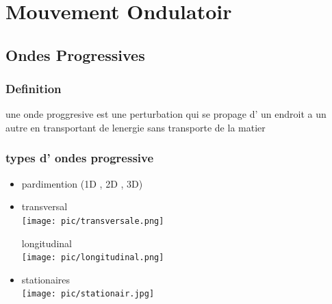 \documentclass[12pt]{book}
\begin{document}
    \chapter{Mouvement Ondulatoir}
        \section{Ondes Progressives}
            \subsection*{Definition}
                une onde proggresive est une perturbation qui se propage d' un endroit a un autre en transportant de lenergie sans transporte de la matier
            \subsection*{types d' ondes progressive}
                \begin{itemize}
                    \item pardimention (1D , 2D , 3D)
                    \item 
                        \begin{minipage}{0.49\linewidth}
                            transversal \\
                            \texttt{[image: pic/transversale.png]}
                        \end{minipage}
                        \begin{minipage}{0.49\linewidth}
                            longitudinal \\
                            \texttt{[image: pic/longitudinal.png]}
                        \end{minipage}
                    \item stationaires \\ \texttt{[image: pic/stationair.jpg]}
                \end{itemize}
\end{document}
